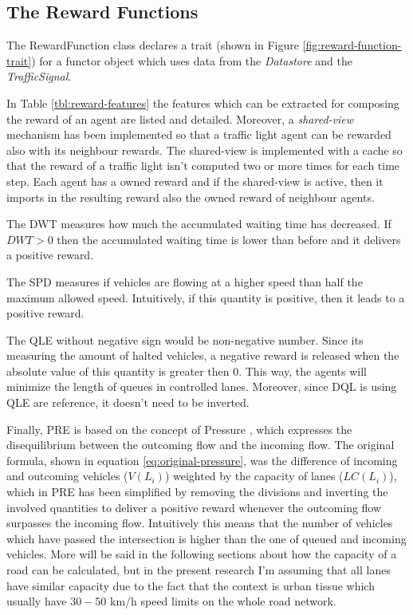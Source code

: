\subsection{The Reward Functions}

The RewardFunction class declares a trait (shown in Figure \ref{fig:reward-function-trait}) for a functor object which uses data from the \textit{Datastore} and the \textit{TrafficSignal}.


In Table \ref{tbl:reward-features} the features which can be extracted for composing the reward of an agent are listed and detailed.
Moreover, a \textit{shared-view} mechanism has been implemented so that a traffic light agent can be rewarded also with its neighbour rewards.
The shared-view is implemented with a cache so that the reward of a traffic light isn't computed two or more times for each time step.
Each agent has a owned reward and if the shared-view is active, then it imports in the resulting reward also the owned reward of neighbour agents.

The DWT measures how much the accumulated waiting time has decreased. If $DWT > 0$ then the accumulated waiting time is lower than before and it delivers a positive reward.

The SPD measures if vehicles are flowing at a higher speed than half the maximum allowed speed. Intuitively, if this quantity is positive, then it leads to a positive reward.

The QLE without negative sign would be non-negative number. Since its measuring the amount of halted vehicles, a negative reward is released when the absolute value of this quantity is greater then 0. This way, the agents will minimize the length of queues in controlled lanes.
Moreover, since DQL is using QLE are reference, it doesn't need to be inverted.

Finally, PRE is based on the concept of Pressure \cite{wei2019presslight}, which expresses the disequilibrium between the outcoming flow and the incoming flow.
The original formula, shown in equation \ref{eq:original-pressure}, was the difference of incoming and outcoming vehicles ($V(L_i)$) weighted by the capacity of lanes ($LC(L_i)$), which in PRE has been simplified by removing the divisions and inverting the involved quantities to deliver a positive reward whenever the outcoming flow surpasses the incoming flow.
Intuitively this means that the number of vehicles which have passed the intersection is higher than the one of queued and incoming vehicles.
More will be said in the following sections about how the capacity of a road can be calculated, but in the present research I'm assuming that all lanes have similar capacity due to the fact that the context is urban tissue which usually have $30-50$ km/h speed limits on the whole road network.

